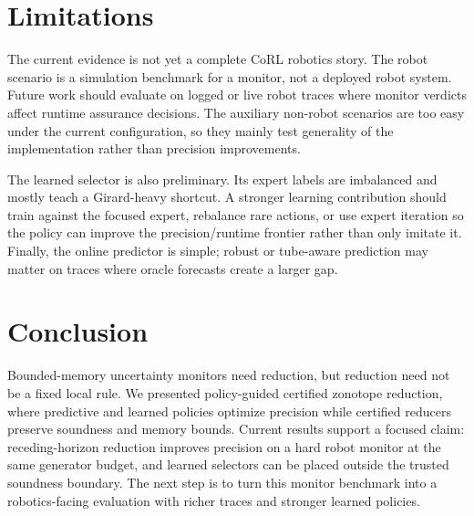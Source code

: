 \documentclass{article}
\begin{document}
\section{Limitations}

The current evidence is not yet a complete CoRL robotics story. The robot
scenario is a simulation benchmark for a monitor, not a deployed robot system.
Future work should evaluate on logged or live robot traces where monitor
verdicts affect runtime assurance decisions. The auxiliary non-robot scenarios
are too easy under the current configuration, so they mainly test generality of
the implementation rather than precision improvements.

The learned selector is also preliminary. Its expert labels are imbalanced and
mostly teach a Girard-heavy shortcut. A stronger learning contribution should
train against the focused expert, rebalance rare actions, or use expert
iteration so the policy can improve the precision/runtime frontier rather than
only imitate it. Finally, the online predictor is simple; robust or tube-aware
prediction may matter on traces where oracle forecasts create a larger gap.

\section{Conclusion}

Bounded-memory uncertainty monitors need reduction, but reduction need not be a
fixed local rule. We presented policy-guided certified zonotope reduction, where
predictive and learned policies optimize precision while certified reducers
preserve soundness and memory bounds. Current results support a focused claim:
receding-horizon reduction improves precision on a hard robot monitor at the
same generator budget, and learned selectors can be placed outside the trusted
soundness boundary. The next step is to turn this monitor benchmark into a
robotics-facing evaluation with richer traces and stronger learned policies.

\clearpage
{}


\end{document}
